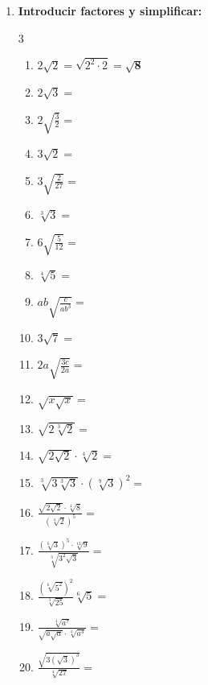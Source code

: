 \documentclass[a4paper,12pt]{article}
\begin{document}
\begin{enumerate}
    \item \textbf{Introducir factores y simplificar:}
    \begin{multicols}{3}
    \begin{enumerate}[label=\alph*)]
        \item $2\sqrt{2} = \sqrt{2^2 \cdot 2} = \mathbf{\sqrt{8}}$
        \item $2\sqrt{3} =$
        \item $2\sqrt{\frac{3}{2}} =$
        \item $3\sqrt{2} =$
        \item $3\sqrt{\frac{2}{27}} =$
        \item $\sqrt[3]{3} =$
        \item $6\sqrt{\frac{5}{12}} =$
        \item $\sqrt[4]{5} =$
        \item $ab\sqrt{\frac{c}{a b^3}} =$
        \item $3\sqrt{7} =$
        \item $2a\sqrt{\frac{3c}{2a}} =$
        \item $\sqrt{x\sqrt{x}} =$
        \item $\sqrt{2\sqrt[3]{2}} =$
        \item $\sqrt{2\sqrt{2}}\cdot\sqrt[4]{2} =$
        \item $\sqrt[3]{3\sqrt[3]{3}}\cdot(\sqrt[9]{3})^2 =$
        \item $\frac{\sqrt{2\sqrt{2}}\cdot\sqrt[4]{8}}{(\sqrt[4]{2})^5} =$
        \item $\frac{(\sqrt[6]{3})^5\cdot\sqrt[12]{9}}{\sqrt[3]{3^2 \sqrt{3}}} =$
        \item $\frac{(\sqrt[6]{5^2})^2}{\sqrt[3]{25}}\sqrt[6]{5} =$
        \item $\frac{\sqrt[4]{a^7}}{\sqrt{a\sqrt{a}}\cdot\sqrt[4]{a^3}} =$
        \item $\frac{\sqrt{3(\sqrt{3})^3}}{\sqrt[4]{27}} =$
    \end{enumerate}
    \end{multicols}


\end{enumerate}
\end{document}
